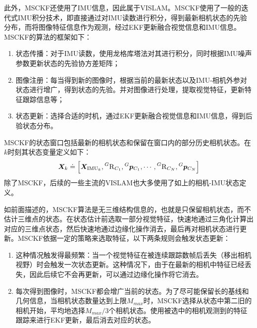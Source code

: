 此外，MSCKF还使用了IMU信息，因此属于VISLAM。MSCKF使用了一般的迭代式IMU积分技术，即直接通过对IMU读数进行积分，得到最新相机状态的先验分布，而将图像特征信息作为观测，经过EKF更新融合视觉信息和IMU信息。MSCKF的算法的框架如下：
\begin{enumerate}
    \item 状态传播：对于IMU读数，使用龙格库塔法对其进行积分，同时根据IMU噪声参数更新状态的先验协方差矩阵；
    \item 图像注册：每当得到新的图像时，根据当前的最新状态以及IMU-相机外参对状态进行增广，得到状态的先验。并对图像进行处理，提取视觉特征，更新特征跟踪信息等；
    \item 状态更新：选择合适的时机，通过EKF更新融合视觉信息和IMU信息，得到后验状态分布。
\end{enumerate}

MSCKF的状态窗口包括最新的相机状态和保留在窗口内的部分历史相机状态。在$k$时刻其状态变量定义如下：
\begin{equation}
    \bm{X}_k \doteq
    \left[
        \bm{X}_{\textrm{IMU}_k},
        \prescript{G}{}{\mathrm R}_{C_1},
        \prescript{G}{}{\bm p}_{C_1},
        \cdots,
        \prescript{G}{}{\mathrm R}_{C_N},
        \prescript{G}{}{\bm p}_{C_N}
    \right]
\end{equation}
除了MSCKF，后续的一些主流的VISLAM也大多使用了如上的相机-IMU状态定义。

如前面描述的，MSCKF算法是无三维结构信息的，也就是只保留相机状态，而不估计三维点的状态。在状态估计前选取一部分视觉特征，快速地通过三角化计算出对应的三维点状态，然后快速地通过边缘化操作消去，最后再对相机状态进行更新。MSCKF依据一定的策略来选取特征，以下两条规则会触发状态更新：
\begin{enumerate}
    \item 这种情况触发得最频繁：当一个视觉特征在被连续跟踪数帧后丢失（移出相机视野）时会触发一次状态更新。这种情况下，由于在最新的相机中特征已经丢失，因此后续它不会再更新，可以通过边缘化操作将它消去。
    \item 每次得到图像时，MSCKF都会增广当前的状态。为了尽可能保留长的基线和几何信息，当相机状态数量达到上限$M_{max}$时，MSCKF选择从状态中第二旧的相机开始，平均地选择$M_{max}/3$个相机状态。使用被选中的相机观测到的特征跟踪来进行EKF更新，最后消去对应的状态。
\end{enumerate}

